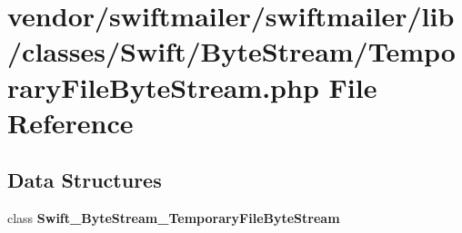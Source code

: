\section{vendor/swiftmailer/swiftmailer/lib/classes/\+Swift/\+Byte\+Stream/\+Temporary\+File\+Byte\+Stream.php File Reference}
\label{_temporary_file_byte_stream_8php}
\subsection*{Data Structures}
\begin{DoxyCompactItemize}
\item 
class {\bf Swift\+\_\+\+Byte\+Stream\+\_\+\+Temporary\+File\+Byte\+Stream}
\end{DoxyCompactItemize}
